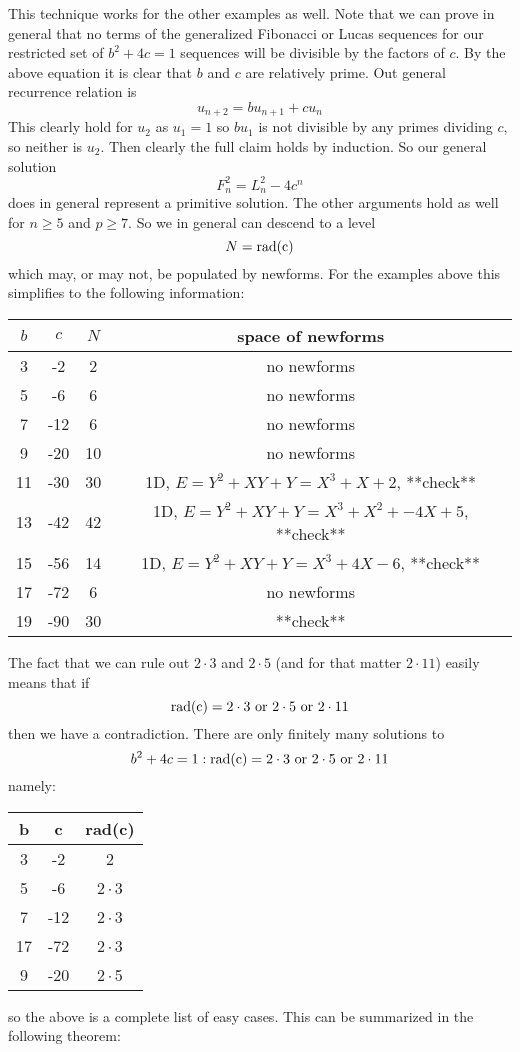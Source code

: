 \documentclass[12pt]{article}
\newcommand{\rad}{\rm rad}
\begin{document}
This technique works for the other examples as well.  Note that we can prove in general that no terms of the generalized Fibonacci or Lucas sequences for our restricted set of $b^2+4c=1$ sequences will be divisible by the factors of $c$.  By the above equation it is clear that $b$ and $c$ are relatively prime.  Out general recurrence relation is
\[ u_{n+2} = bu_{n+1} +cu_n \]
This clearly hold for $u_2$ as $u_1=1$ so $bu_{1}$ is not divisible by any primes dividing $c$, so neither is $u_2$.  Then clearly the full claim holds by induction.  So our general solution
\[ F_n^2 = L_n^2 - 4c^n\]
does in general represent a primitive solution.  The other arguments hold as well for $n \geq 5$ and $p \geq 7$.  So we in general can descend to a level
\[ N = \rad(c) \]
which may, or may not, be populated by newforms.  For the examples above this simplifies to the following information:

\begin{center}
\begin{tabular}{ c c | c c}
$b$ & $c$ & $N$ & space of newforms  \\ \hline \hline
3 & -2 & 2 & no newforms \\
5 & -6 & 6 & no newforms\\
7 & -12 & 6 & no newforms\\
9 & -20 & 10 & no newforms\\
11 & -30 & 30 & 1D, $E = Y^2 +XY + Y = X^3+X+2$,  **check** \\
13 & -42 & 42 & 1D, $E = Y^2 +XY +Y = X^3 + X^2 +-4X+5$,   **check** \\
15 & -56 & 14& 1D, $E = Y^2 +XY+Y = X^3 +4X-6$,   **check**  \\
17 & -72 & 6 & no newforms \\
19 & -90 & 30 &  **check**
\end{tabular}
\end{center}


The fact that we can rule out $2 \cdot 3$ and $2 \cdot 5$ (and for that matter $2 \cdot 11$) easily means that if 
\[ \rad(c) = 2 \cdot 3 \text{ or } 2 \cdot 5 \text{ or }2 \cdot 11 \]
then we have a contradiction.  There are only finitely many solutions to
\[ b^2 +4c = 1 : \rad(c) = 2 \cdot 3 \text{ or } 2 \cdot 5 \text{ or }2 \cdot 11 \]
namely:
\begin{center}
\begin{tabular}{c c c}
b & c & \rad(c) \\ \hline \hline
3 & -2 & 2  \\
5 & -6 & $2\cdot$3  \\
7 & -12 & $2\cdot$3  \\
17 & -72 & $2\cdot$3 \\
9 & -20 & $2\cdot$5
\end{tabular}
\end{center}
so the above is a complete list of easy cases.  This can be summarized in the following theorem:
\end{document}
